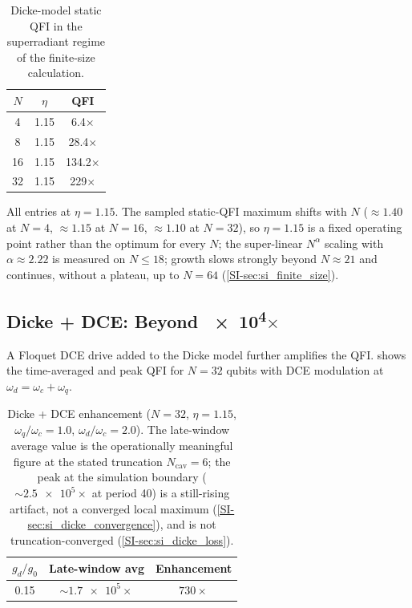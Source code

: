 \documentclass[aps,prxquantum,preprint,superscriptaddress,amsmath,amssymb]{revtex4-2}
\begin{document}
\begin{table}[hbt!]
\centering
\caption{Dicke-model static QFI in the superradiant regime of the finite-size calculation.}
\label{tab:trackB_dicke}
\begin{tabular}{c c c}
\toprule
{$N$} & {$\eta$} & {QFI} \\
\midrule
\num{4} & \num{1.15} & \num{6.4}$\times$ \\
\num{8} & \num{1.15} & \num{28.4}$\times$ \\
\num{16} & \num{1.15} & \num{134.2}$\times$ \\
\num{32} & \num{1.15} & \num{229}$\times$ \\
\bottomrule
\end{tabular}
\begin{flushleft}
\footnotesize All entries at $\eta=\num{1.15}$. The sampled static-QFI maximum shifts with $N$ ($\approx\num{1.40}$ at $N=\num{4}$, $\approx\num{1.15}$ at $N=\num{16}$, $\approx\num{1.10}$ at $N=\num{32}$), so $\eta=\num{1.15}$ is a fixed operating point rather than the optimum for every $N$; the super-linear $N^\alpha$ scaling with $\alpha\approx\num{2.22}$ is measured on $N\le\num{18}$; growth slows strongly beyond $N\approx\num{21}$ and continues, without a plateau, up to $N=\num{64}$ (\cref{SI-sec:si_finite_size}).
\end{flushleft}
\end{table}

\subsection{Dicke + DCE: Beyond \num{e4}$\times$}

A Floquet DCE drive added to the Dicke model further amplifies the QFI.  shows the time-averaged and peak QFI for $N=\num{32}$ qubits with DCE modulation at $\omega_d = \omega_c + \omega_q$.

\begin{table}[hbt!]
\centering
\caption{Dicke + DCE enhancement ($N=\num{32}$, $\eta=\num{1.15}$, $\omega_q/\omega_c=\num{1.0}$, $\omega_d/\omega_c=\num{2.0}$). The late-window average value is the operationally meaningful figure at the stated truncation $N_{\text{cav}}=\num{6}$; the peak at the simulation boundary ($\sim\!\num{2.5e5}\times$ at period \num{40}) is a still-rising artifact, not a converged local maximum (\cref{SI-sec:si_dicke_convergence}), and is not truncation-converged (\cref{SI-sec:si_dicke_loss}).}
\label{tab:trackB_dicke_dce}
\begin{tabular}{c c c}
\toprule
{$g_d/g_0$} & {Late-window avg} & {Enhancement} \\
\midrule
\num{0.15} & $\sim\!\num{1.7e5}\times$ & $\num{730}\times$ \\
\bottomrule
\end{tabular}
\end{table}
\end{document}
